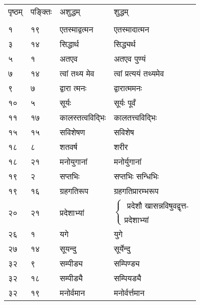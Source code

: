 \documentclass[11pt, openany]{book}
\begin{document}
\begin{longtable}{p{1cm} p{1.5cm} p{4cm} p{4cm}}

पृष्ठम् & पङ्क्तिः &अशुद्धम् & शुद्धम्\\
\vspace{2mm}\\

 १ & १९ & एतस्माद्वत्मन & एतस्मादात्मन \\

 ३ & १४ & सिद्धार्थ & सिद्ध्यर्थ \\

 ५ & १ & अतएव & अतएव पुण्यं\\

 ७ & १४ & त्वां तथ्य मेव & त्वां प्रत्ययं तथ्यमेव \\

 ९ & ७ &  द्वारा त्मनः  & द्वारात्ममनः \\

 १० & ५ & सूर्यः & सूर्यः पूर्वं\\

 ११ & १७ & कालस्तत्वविद्भिः & कालतत्त्वविद्भिः \\

 १५ & १५ & सविशेषण  & सविशेष \\

 १८ & ८ & शतवर्ष & शरीर\\ 

 १८ & २१ & मनोयुगानां & मनोर्युगानां \\

 १९ & २ & सप्तभिः & सप्तभिः सन्धिभिः \\

 १९ & १६ & ग्रहगतिरूप & ग्रहगतिप्रारम्भरूप \\

 २० & २१ & प्रदेशाभ्यां & $\begin{cases}\mbox{ प्रदेशौ खासन्नविषुवद्वृत्त-}\\
\mbox{प्रदेशाभ्यां} \end{cases}$\\

 २६ & १ & यगे & युगे \\

 २७ & १४ & सूयन्दु & सूर्येन्दु \\

 ३२ & ९ & सम्पीड्य & सम्पिण्ड्य \\

 ३२ & १८ & सम्पीड्यै & सम्पियड्यै \\

 ३२ & १९ & मनोर्वमान  & मनोर्वर्त्तमान\\



\end{longtable}
\end{document}

